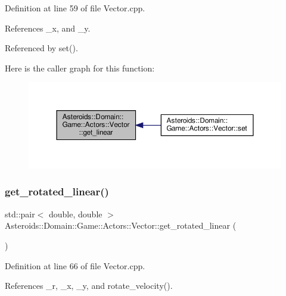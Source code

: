 Definition at line 59 of file Vector.\+cpp.



References \+\_\+x, and \+\_\+y.



Referenced by set().

Here is the caller graph for this function\+:\nopagebreak
\begin{figure}[H]
\begin{center}
\leavevmode
\includegraphics[width=350pt]{classAsteroids_1_1Domain_1_1Game_1_1Actors_1_1Vector_aafa43064d8a1d74908e998a613836b83_icgraph}
\end{center}
\end{figure}
\mbox{\label{classAsteroids_1_1Domain_1_1Game_1_1Actors_1_1Vector_a59d89995d9c975994f8c019f94ce674f}} 
\subsubsection{\texorpdfstring{get\+\_\+rotated\+\_\+linear()}{get\_rotated\_linear()}}
{\footnotesize\ttfamily std\+::pair$<$ double, double $>$ Asteroids\+::\+Domain\+::\+Game\+::\+Actors\+::\+Vector\+::get\+\_\+rotated\+\_\+linear (\begin{DoxyParamCaption}{ }\end{DoxyParamCaption})}



Definition at line 66 of file Vector.\+cpp.



References \+\_\+r, \+\_\+x, \+\_\+y, and rotate\+\_\+velocity().


